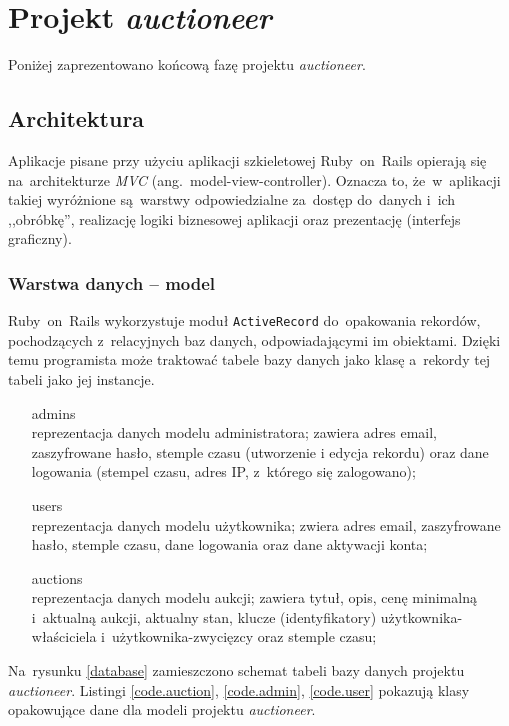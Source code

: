 \section{Projekt \textit{auctioneer}}

Poniżej zaprezentowano końcową fazę projektu \textit{auctioneer}.

\subsection{Architektura}

Aplikacje pisane przy użyciu aplikacji szkieletowej Ruby~on~Rails opierają się na~architekturze \textit{MVC} (ang.~model-view-controller). Oznacza to, że~w~aplikacji takiej wyróżnione są~warstwy odpowiedzialne za~dostęp do~danych i~ich ,,obróbkę'', realizację logiki biznesowej aplikacji oraz prezentację (interfejs graficzny).

\subsubsection{Warstwa danych -- model}

Ruby~on~Rails wykorzystuje moduł \texttt{ActiveRecord} do~opakowania rekordów, pochodzących z~relacyjnych baz danych, odpowiadającymi im obiektami. Dzięki temu programista może traktować tabele bazy danych jako klasę a~rekordy tej tabeli jako jej instancje.

\begin{itemize}
  \item[admins]\hfill\\ reprezentacja danych modelu administratora; zawiera adres email, zaszyfrowane hasło, stemple czasu (utworzenie i edycja rekordu) oraz dane logowania (stempel czasu, adres IP, z~którego się zalogowano);
  \item[users]\hfill\\ reprezentacja danych modelu użytkownika; zwiera adres email, zaszyfrowane hasło, stemple czasu, dane logowania oraz dane aktywacji konta;
  \item[auctions]\hfill\\ reprezentacja danych modelu aukcji; zawiera tytuł, opis, cenę minimalną i~aktualną aukcji, aktualny stan, klucze (identyfikatory) użytkownika-właściciela i~użytkownika-zwycięzcy oraz stemple czasu;
\end{itemize}

Na~rysunku \ref{database} zamieszczono schemat tabeli bazy danych projektu \textit{auctioneer}. Listingi \ref{code.auction}, \ref{code.admin}, \ref{code.user} pokazują klasy opakowujące dane dla modeli projektu \textit{auctioneer}.

